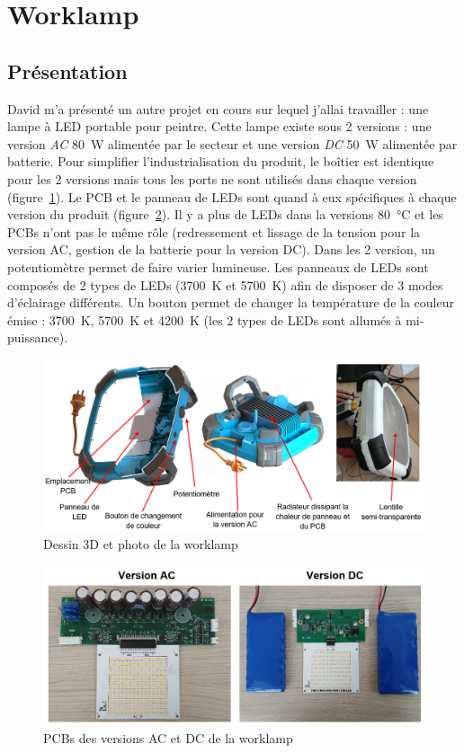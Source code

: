 \documentclass[a4paper, 12pt]{report}
\begin{document}
\section{Worklamp}
\subsection{Présentation}
David m’a présenté un autre projet en cours sur lequel j'allai travailler : une lampe à LED portable pour peintre. Cette lampe existe sous 2 versions : une version \emph{AC} \SI{80}{\watt} alimentée par le secteur et une version \emph{DC} \SI{50}{\watt} alimentée par batterie. Pour simplifier l'industrialisation du produit, le boîtier est identique pour les 2 versions mais tous les ports ne sont utilisés dans chaque version (figure~\ref{fig:captioned_worklamp}). Le PCB et le panneau de LEDs sont quand à eux spécifiques à chaque version du produit (figure~\ref{fig:worklamp_PCBs}). Il y a plus de LEDs dans la versions \SI{80}{\celsius} et les PCBs n'ont pas le même rôle (redressement et lissage de la tension pour la version AC, gestion de la batterie pour la version DC).
Dans les 2 version, un potentiomètre permet de faire varier lumineuse. Les panneaux de LEDs sont composés de 2 types de LEDs (\SI{3700}{\kelvin} et \SI{5700}{\kelvin}) afin de disposer de 3 modes d’éclairage différents. Un bouton permet de changer la température de la couleur émise : \SI{3700}{\kelvin}, \SI{5700}{\kelvin} et \SI{4200}{\kelvin} (les 2 types de LEDs sont allumés à mi-puissance). 

\begin{figure}[H]
\centering
\includegraphics[scale=0.45]{figures/screenshots/captioned_worklamp.png}
\caption{Dessin 3D et photo de la worklamp}
\label{fig:captioned_worklamp}
\end{figure}

\begin{figure}[H]
\centering
\includegraphics[scale=0.43]{figures/photos/worklamp_PCBs.jpg}
\caption{PCBs des versions AC et DC de la worklamp}
\label{fig:worklamp_PCBs}
\end{figure}
\end{document}
